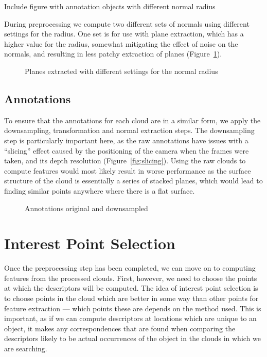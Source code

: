 \documentclass[11pt,a4paper]{kth-mag}
\begin{document}
Include figure with annotation objects with different normal radius

During preprocessing we compute two different sets of normals using different
settings for the radius. One set is for use with plane extraction, which has a
higher value for the radius, somewhat mitigating the effect of noise on the
normals, and resulting in less patchy extraction of planes
(Figure~\ref{fig:plane_normrad}).

\begin{figure}
  \centering
  
  \caption{Planes extracted with different settings for the normal radius}
  \label{fig:plane_normrad}
\end{figure}

\section{Annotations}
To ensure that the annotations for each cloud are in a similar form, we apply
the downsampling, transformation and normal extraction steps. The downsampling
step is particularly important here, as the raw annotations have issues with a
``slicing'' effect caused by the positioning of the camera when the frames were
taken, and its depth resolution (Figure~\ref{fig:slicing}). Using the raw clouds
to compute features would most likely result in worse performance as the surface
structure of the cloud is essentially a series of stacked planes, which would
lead to finding similar points anywhere where there is a flat surface.

\begin{figure}
  \centering
  \caption{Annotations original and downsampled}
  \label{fig:annotation_ds}
\end{figure}
\chapter{Interest Point Selection}
\label{chap:interest}
Once the preprocessing step has been completed, we can move on to computing
features from the processed clouds. First, however, we need to choose the points
at which the descriptors will be computed. The idea of interest point selection
is to choose points in the cloud which are better in some way than other points
for feature extraction --- which points these are depends on the method used.
This is important, as if we can compute descriptors at locations which are
unique to an object, it makes any correspondences that are found when comparing
the descriptors likely to be actual occurrences of the object in the clouds in
which we are searching.
\end{document}
